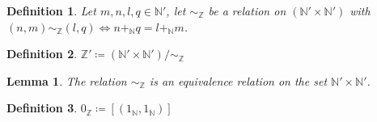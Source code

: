\documentclass[11pt]{article}
\theoremstyle{break}
\theoremstyle{break}
\newtheorem{lem}{Lemma}[thm]
\newtheorem{defn}{Definition}[corL]
\newcommand{\R}{\mathbb{R}}
\newcommand{\N}{\mathbb{N}}
\newcommand{\Z}{\mathbb{Z}}
\begin{document}
%	
%	
%	
	
	\begin{defn}
		Let $m,n,l,q \in \N'$, let $\sim_{\Z}$ be a relation on $(\N' \times \N')$ with $(n,m) \sim_{\Z} (l,q) \iff n +_{\N} q = l +_{\N} m$.
	\end{defn}
	
	\begin{defn}
		 $\Z' \coloneqq {(\N' \times \N')}/{\sim_{\Z}}$	
	\end{defn}
		
	\begin{lem}
		The relation $\sim_{\Z}$ is an equivalence relation on the set $\N' \times \N'$.
	\end{lem}
	
	\begin{defn}
		$0_{\Z} \coloneqq [(1_\N,1_\N)]$
	\end{defn}
	
\end{document}
